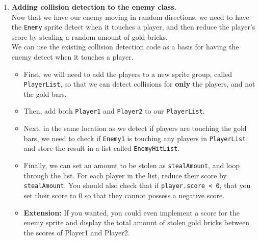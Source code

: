 \documentclass[11pt]{report}
\begin{document}
\begin{enumerate}
	\item {\bf Adding collision detection to the enemy class.}\\
	Now that we have our enemy moving in random directions, we need to have the {\tt Enemy} sprite detect when it touches a player, and then reduce the player's score by stealing a random amount of gold bricks.\\

	We can use the existing collision detection code as a basis for having the enemy detect when it touches a player.

	\begin{itemize}
		\item First, we will need to add the players to a new sprite group, called {\tt PlayerList}, so that we can detect collisions for \textbf{only} the players, and not the gold bars.

		\item Then, add both {\tt Player1} and {\tt Player2} to our {\tt PlayerList}.

		\item Next, in the same location as we detect if players are touching the gold bars, we need to check if {\tt Enemy1} is touching any players in {\tt PlayerList}, and store the result in a list called {\tt EnemyHitList}.

		\item Finally, we can set an amount to be stolen as {\tt stealAmount}, and loop through the list. For each player in the list, reduce their score by {\tt stealAmount}. You should also check that if {\tt player.score < 0}, that you set their score to $0$ so that they cannot possess a negative score.

		\item \textbf{Extension:} If you wanted, you could even implement a score for the enemy sprite and display the total amount of stolen gold bricks between the scores of Player1 and Player2.
	\end{itemize}
\end{enumerate}
\end{document}
